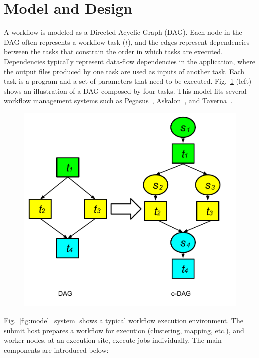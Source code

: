 \section{Model and Design}
\label{sec:model}


A workflow is modeled as a Directed Acyclic Graph (DAG). Each node in the DAG often represents a workflow task ($t$), and the edges represent dependencies between the tasks that constrain the order in which tasks are executed. Dependencies typically represent data-flow dependencies in the application, where the output files produced by one task are used as inputs of another task. Each task is a program and a set of parameters that need to be executed. Fig.~\ref{fig:model_odag} (left) shows an illustration of a DAG composed by four tasks. This model fits several workflow management systems such as Pegasus~\cite{Deelman:2005:PFM:1239649.1239653}, Askalon~\cite{Fahringer:2005:ATS:1064323.1064331}, and Taverna~\cite{Oinn:2006:TLC:1148437.1148448}. 

\begin{figure}[htb]
	\centering
	\includegraphics[width=0.7\linewidth]{figures/model/odag_color.pdf}
	\label{fig:model_odag}
	\vspace{-15pt}
\end{figure}

Fig.~\ref{fig:model_system} shows a typical workflow execution environment. The submit host prepares a workflow for execution (clustering, mapping, etc.), and worker nodes, at an execution site, execute jobs individually. The main components are introduced below:

